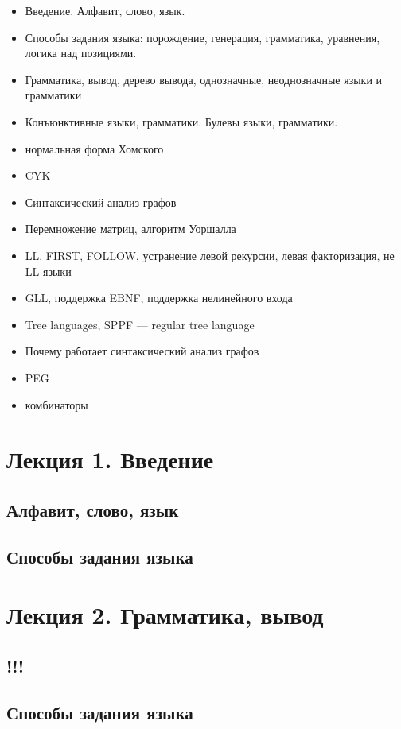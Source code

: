 \documentclass[a5paper]{article}
\begin{document}
\begin{itemize}
    \item Введение. Алфавит, слово, язык.
    \item Способы задания языка: порождение, генерация, грамматика, уравнения, логика над позициями.
    \item Грамматика, вывод, дерево вывода, однозначные, неоднозначные языки и грамматики
    \item Конъюнктивные языки, грамматики. Булевы языки, грамматики.
    \item нормальная форма Хомского 
    \item CYK
    \item Синтаксический анализ графов
    \item Перемножение матриц, алгоритм Уоршалла
    \item LL, FIRST, FOLLOW, устранение левой рекурсии, левая факторизация, не LL языки
    \item GLL, поддержка EBNF, поддержка нелинейного входа
    \item Tree languages, SPPF --- regular tree language
    \item Почему работает синтаксический анализ графов
    \item PEG
    \item комбинаторы
\end{itemize}


\section{Лекция 1. Введение}
\subsection{Алфавит, слово, язык}

\subsection{Способы задания языка}


\section{Лекция 2. Грамматика, вывод}
\subsection{!!!}

\subsection{Способы задания языка}
\end{document}
